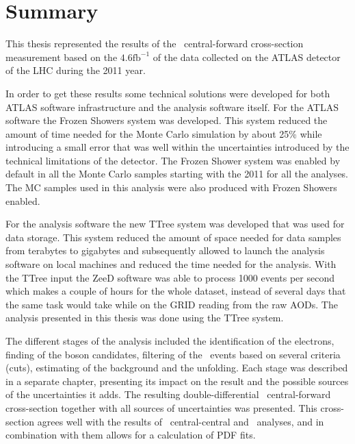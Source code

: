 \chapter{Summary}
\label{sec:Summary}

This thesis represented the results of the \Zee\ central-forward cross-section measurement based on the $4.6 \mathrm{fb}^{-1}$ of the data collected on the ATLAS detector of the LHC during the 2011 year.

In order to get these results some technical solutions were developed for both ATLAS software infrastructure and the analysis software itself. For the ATLAS software the Frozen Showers system was developed. This system reduced the amount of time needed for the Monte Carlo simulation by about 25\% while introducing a small error that was well within the uncertainties introduced by the technical limitations of the detector. The Frozen Shower system was enabled by default in all the Monte Carlo samples starting with the 2011 for all the analyses. The MC samples used in this analysis were also produced with Frozen Showers enabled.

For the analysis software the new TTree system was developed that was used for data storage. This system reduced the amount of space needed for data samples from terabytes to gigabytes and subsequently allowed to launch the analysis software on local machines and reduced the time needed for the analysis. With the TTree input the ZeeD software was able to process 1000 events per second which makes a couple of hours for the whole dataset, instead of several days that the same task would take while on the GRID reading from the raw AODs. The analysis presented in this thesis was done using the TTree system.

The different stages of the analysis included the identification of the electrons, finding of the boson candidates, filtering of the \Zee\ events based on several criteria (cuts), estimating of the background and the unfolding. Each stage was described in a separate chapter, presenting its impact on the result and the possible sources of the uncertainties it adds. The resulting double-differential \Zee\ central-forward cross-section  together with all sources of uncertainties was presented. This cross-section agrees well with the results of \Zee\ central-central and \Zmm\ analyses, and in combination with them allows for a calculation of PDF fits.
